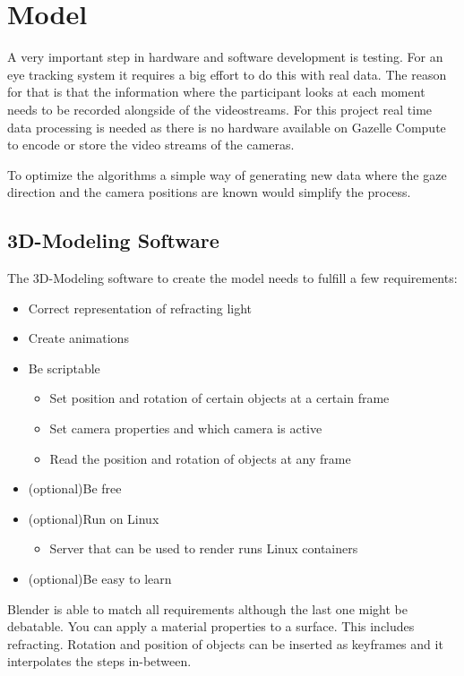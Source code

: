 \chapter{Model}
\label{chap:Model}

A very important step in hardware and software development is testing. For an eye tracking system it requires a big effort to do this with real data. The reason for that is that the information where the participant looks at each moment needs to be recorded alongside of the videostreams. For this project real time data processing is needed as there is no hardware available on Gazelle Compute to encode or store the video streams of the cameras.

To optimize the algorithms a simple way of generating new data where the gaze direction and the camera positions are known would simplify the process. 
\section{3D-Modeling Software}
\label{sec:whatIsImportant}

The 3D-Modeling software to create the model needs to fulfill a few requirements:
\begin{itemize}
	\item Correct representation of refracting light
	\item Create animations 
	\item Be scriptable
	\begin{itemize}
		\item Set position and rotation of certain objects at a certain frame
		\item Set camera properties and which camera is active
		\item Read the position and rotation of objects at any frame
	\end{itemize}
	\item (optional)Be free
	\item (optional)Run on Linux
	\begin{itemize}
		\item Server that can be used to render runs Linux containers
	\end{itemize}
	\item (optional)Be easy to learn
\end{itemize}

Blender is able to match all requirements although the last one might be debatable. You can apply a material properties to a surface. This includes refracting. Rotation and position of objects can be inserted as keyframes and it interpolates the steps in-between. 


